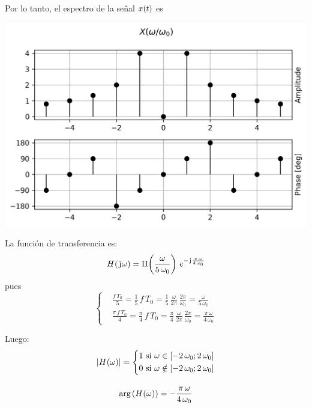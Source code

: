 \begin{mdframed}[style=ExampleFrame]
    Por lo tanto, el espectro de la señal $\fx[x]{t}$ es
    \begin{center}
        \includegraphics[width=\linewidth]{./images/ej_siemtria_hermitiana_x.png}
    \end{center}

    La función de transferencia es:
    \[
        \fx[H]{\iu \omega} = \pulse{\omega}{5 \, \omega_0} \, e^{- \iu \frac{\pi \, \omega}{4 \, \omega_0}}
    \]
    pues
    \[
        \left\{
        \begin{aligned}
            & \frac{f \, T_0}{5}
            = \frac{1}{5} \, f \, T_0
            = \frac{1}{5} \, \frac{\omega}{2 \pi} \, \frac{2 \pi}{\omega_0}
            = \frac{\omega}{5 \, \omega_0}
            \\[1em]
            & \frac{\pi \, f \, T_0}{4}
            = \frac{\pi}{4} \, f \, T_0
            = \frac{\pi}{4} \, \frac{\omega}{2 \pi} \, \frac{2 \pi}{\omega_0}
            = \frac{\pi \, \omega}{4 \, \omega_0}
        \end{aligned}
        \right.
    \]

    Luego:
    \begin{gather*}
        \norm{\fx[H]{\omega}} =
        \left\{
        \begin{aligned}
            & 1 \text{ si } \omega \in [-2 \, \omega_0 ; 2 \, \omega_0]
            \\
            & 0 \text{ si } \omega \notin [-2 \, \omega_0 ; 2 \, \omega_0]
        \end{aligned}
        \right.
        \\[1em]
        \fx[\arg]{\fx[H]{\omega}} =
        - \frac{\pi \, \omega}{4 \, \omega_0}
    \end{gather*}


\end{mdframed}
